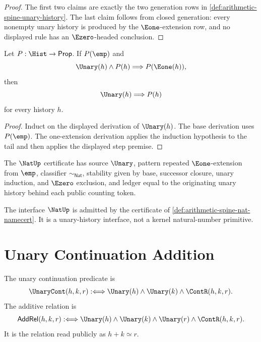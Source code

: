 \begin{proof}
The first two claims are exactly the two generation rows in
\autoref{def:arithmetic-spine-unary-history}.  The last claim follows from
closed generation: every nonempty unary history is produced by the
$\Eone$-extension row, and no displayed rule has an $\Ezero$-headed
conclusion.
\end{proof}

\begin{theorem}
\label{thm:arithmetic-spine-unary-induction}
Let $P:\Hist\to\mathsf{Prop}$.  If $P(\emp)$ and
$$
\Unary(h)\wedge P(h)\Longrightarrow P(\Eone(h)),
$$
then
$$
\Unary(h)\Longrightarrow P(h)
$$
for every history $h$.
\end{theorem}

\begin{proof}
Induct on the displayed derivation of $\Unary(h)$.  The base derivation
uses $P(\emp)$.  The one-extension derivation applies the induction
hypothesis to the tail and then applies the displayed step premise.
\end{proof}

\begin{definition}
\label{def:arithmetic-spine-nat-namecert}
The $\NatUp$ certificate has source $\Unary$, pattern repeated
$\Eone$-extension from $\emp$, classifier $\sim_{\mathsf{Nat}}$, stability
given by base, successor closure, unary induction, and $\Ezero$ exclusion,
and ledger equal to the originating unary history behind each public
counting token.
\end{definition}

\begin{corollary}
\label{cor:arithmetic-spine-nat-admission}
The interface $\NatUp$ is admitted by the certificate of
\autoref{def:arithmetic-spine-nat-namecert}.  It is a unary-history
interface, not a kernel natural-number primitive.
\end{corollary}

\section{Unary Continuation Addition}
\label{sec:arithmetic-spine-add}

\begin{definition}
\label{def:arithmetic-spine-add-relation}
The unary continuation predicate is
$$
\UnaryCont(h,k,r)
:\Longleftrightarrow
\Unary(h)\wedge\Unary(k)\wedge\ContR(h,k,r).
$$
The additive relation is
$$
\mathsf{AddRel}(h,k,r)
:\Longleftrightarrow
\Unary(h)\wedge\Unary(k)\wedge\Unary(r)\wedge\ContR(h,k,r).
$$
It is the relation read publicly as $h+k\simeq r$.
\end{definition}

